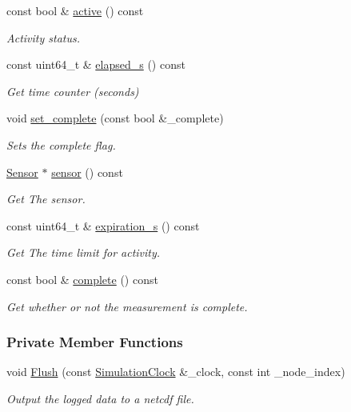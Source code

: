 \begin{DoxyCompactItemize}
const bool \& \hyperlink{classosse_1_1collaborate_1_1_subsystem_sensing_a21b24d19773e1a831335c6b279bf21b9}{active} () const
\begin{DoxyCompactList}\small\item\em Activity status. \end{DoxyCompactList}\item 
const uint64\+\_\+t \& \hyperlink{classosse_1_1collaborate_1_1_subsystem_sensing_a8ed2eb5dfbb7d722c04950fd77d8b5e0}{elapsed\+\_\+s} () const
\begin{DoxyCompactList}\small\item\em Get time counter (seconds) \end{DoxyCompactList}\item 
void \hyperlink{classosse_1_1collaborate_1_1_subsystem_sensing_ad29be395e00832a8a3a5958a449d491a}{set\+\_\+complete} (const bool \&\+\_\+complete)
\begin{DoxyCompactList}\small\item\em Sets the complete flag. \end{DoxyCompactList}\item 
\hyperlink{classosse_1_1collaborate_1_1_sensor}{Sensor} $\ast$ \hyperlink{classosse_1_1collaborate_1_1_subsystem_sensing_acab2a1de4777a5ef9552dc8823949a1b}{sensor} () const
\begin{DoxyCompactList}\small\item\em Get The sensor. \end{DoxyCompactList}\item 
const uint64\+\_\+t \& \hyperlink{classosse_1_1collaborate_1_1_subsystem_sensing_ab94e0390b0014014b66b49815f6b25cb}{expiration\+\_\+s} () const
\begin{DoxyCompactList}\small\item\em Get The time limit for activity. \end{DoxyCompactList}\item 
const bool \& \hyperlink{classosse_1_1collaborate_1_1_subsystem_sensing_addbe1b3cecafc40119deaa33359069b5}{complete} () const
\begin{DoxyCompactList}\small\item\em Get whether or not the measurement is complete. \end{DoxyCompactList}\end{DoxyCompactItemize}
\subsubsection*{Private Member Functions}
\begin{DoxyCompactItemize}
\item 
void \hyperlink{classosse_1_1collaborate_1_1_subsystem_sensing_a56cb5fced3dd63c0f2d14fed8a4f1cf7}{Flush} (const \hyperlink{classosse_1_1collaborate_1_1_simulation_clock}{Simulation\+Clock} \&\+\_\+clock, const int \+\_\+node\+\_\+index)
\begin{DoxyCompactList}\small\item\em Output the logged data to a netcdf file. \end{DoxyCompactList}\end{DoxyCompactItemize}
